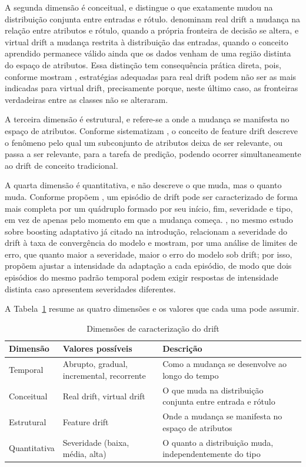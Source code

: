A segunda dimensão é conceitual, e distingue o que exatamente mudou na
distribuição conjunta entre entradas e rótulo. 
denominam real drift a mudança na relação entre atributos e rótulo, quando a
própria fronteira de decisão se altera, e virtual drift a mudança restrita à
distribuição das entradas, quando o conceito aprendido permanece válido ainda
que os dados venham de uma região distinta do espaço de atributos. Essa
distinção tem consequência prática direta, pois, conforme mostram
, estratégias adequadas para real drift podem não
ser as mais indicadas para virtual drift, precisamente porque, neste último
caso, as fronteiras verdadeiras entre as classes não se alteraram.

A terceira dimensão é estrutural, e refere-se a onde a mudança se manifesta no
espaço de atributos. Conforme sistematizam , o
conceito de feature drift descreve o fenômeno pelo qual um subconjunto de
atributos deixa de ser relevante, ou passa a ser relevante, para a tarefa de
predição, podendo ocorrer simultaneamente ao drift de conceito tradicional.

A quarta dimensão é quantitativa, e não descreve o que muda, mas o quanto
muda. Conforme propõem , um episódio de drift
pode ser caracterizado de forma mais completa por um quádruplo formado por
seu início, fim, severidade e tipo, em vez de apenas pelo momento em que a
mudança começa. , no mesmo estudo sobre
boosting adaptativo já citado na introdução, relacionam a severidade do
drift à taxa de convergência do modelo e mostram, por uma análise de limites
de erro, que quanto maior a severidade, maior o erro do modelo sob drift; por
isso, propõem ajustar a intensidade da adaptação a cada episódio, de modo que
dois episódios do mesmo padrão temporal podem exigir respostas de intensidade
distinta caso apresentem severidades diferentes.

A Tabela~\ref{tab:dimensoes} resume as quatro dimensões e os valores que cada
uma pode assumir.

\begin{table}[h]
\centering
\caption{Dimensões de caracterização do drift}
\label{tab:dimensoes}
\begin{tabular}{p{2.6cm}p{3.8cm}p{5.8cm}}
\toprule
\textbf{Dimensão} & \textbf{Valores possíveis} & \textbf{Descrição} \\
\midrule
Temporal & Abrupto, gradual, incremental, recorrente & Como a mudança se
desenvolve ao longo do tempo \\
Conceitual & Real drift, virtual drift & O que muda na distribuição conjunta
entre entrada e rótulo \\
Estrutural & Feature drift & Onde a mudança se manifesta no espaço de
atributos \\
Quantitativa & Severidade (baixa, média, alta) & O quanto a distribuição
muda, independentemente do tipo \\
\bottomrule
\end{tabular}
\end{table}

